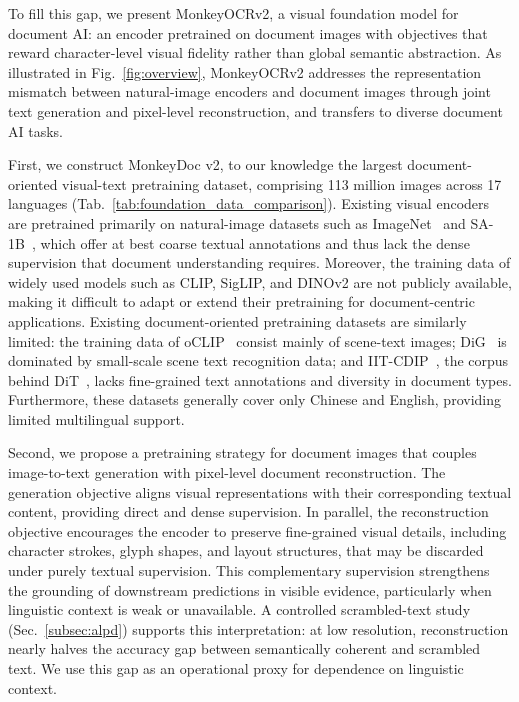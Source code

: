 \documentclass{article}
\begin{document}
To fill this gap, we present MonkeyOCRv2, a visual foundation model for document AI: an encoder pretrained on document images with objectives that reward character-level visual fidelity rather than global semantic abstraction. As illustrated in Fig.~\ref{fig:overview}, MonkeyOCRv2 addresses the representation mismatch between natural-image encoders and document images through joint text generation and pixel-level reconstruction, and transfers to diverse document AI tasks.

First, we construct MonkeyDoc v2, to our knowledge the largest document-oriented visual-text pretraining dataset, comprising 113 million images across 17 languages (Tab.~\ref{tab:foundation_data_comparison}). Existing visual encoders are pretrained primarily on natural-image datasets such as ImageNet~\cite{imagenet} and SA-1B~\cite{sam}, which offer at best coarse textual annotations and thus lack the dense supervision that document understanding requires. Moreover, the training data of widely used models such as CLIP, SigLIP, and DINOv2 are not publicly available, making it difficult to adapt or extend their pretraining for document-centric applications. Existing document-oriented pretraining datasets are similarly limited: the training data of oCLIP~\cite{oclip} consist mainly of scene-text images; DiG~\cite{dig} is dominated by small-scale scene text recognition data; and IIT-CDIP~\cite{iitcdip}, the corpus behind DiT~\cite{dit}, lacks fine-grained text annotations and diversity in document types. Furthermore, these datasets generally cover only Chinese and English, providing limited multilingual support.

Second, we propose a pretraining strategy for document images that couples image-to-text generation with pixel-level document reconstruction. The generation objective aligns visual representations with their corresponding textual content, providing direct and dense supervision. In parallel, the reconstruction objective encourages the encoder to preserve fine-grained visual details, including character strokes, glyph shapes, and layout structures, that may be discarded under purely textual supervision. This complementary supervision strengthens the grounding of downstream predictions in visible evidence, particularly when linguistic context is weak or unavailable. A controlled scrambled-text study (Sec.~\ref{subsec:alpd}) supports this interpretation: at low resolution, reconstruction nearly halves the accuracy gap between semantically coherent and scrambled text. We use this gap as an operational proxy for dependence on linguistic context.
\end{document}

